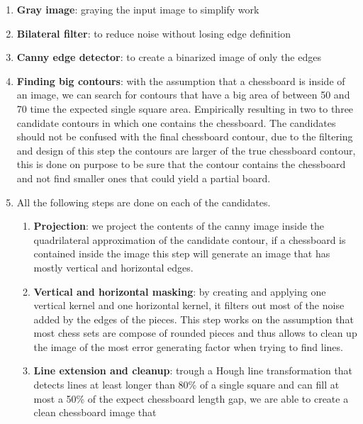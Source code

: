 \begin{enumerate}
    \item 
    {
        \textbf{Gray image}: graying the input image to simplify work
    }
    \item 
    {
        \textbf{Bilateral filter}: to reduce noise without losing edge definition
    }
    \item
    {
        \textbf{Canny edge detector}: to create a binarized image of only the edges
    }
    \item 
    {
        \textbf{Finding big contours}: with the assumption that a chessboard is inside of an image, we can search for contours 
        that have a big area of between 50 and 70 time the expected single square area. Empirically resulting in two to three candidate contours in which 
        one contains the chessboard. \newline
        The candidates should not be confused with the final chessboard contour, due to the filtering and design of this step the contours are larger of the true 
        chessboard contour, this is done on purpose to be sure that the contour contains the chessboard and not find smaller ones that could yield a partial board. 
    }
    \item 
    {
        All the following steps are done on each of the candidates.
        \begin{enumerate}
            \item 
            {
                \textbf{Projection}: we project the contents of the canny image inside the quadrilateral approximation of the candidate contour, 
                if a chessboard is contained inside the image this step will generate an image that has mostly vertical and horizontal edges.
            }
            \item
            {
                \textbf{Vertical and horizontal masking}: by creating and applying one vertical kernel and one horizontal kernel, it filters out most
                of the noise added by the edges of the pieces. \newline
                This step works on the assumption that most chess sets are compose of rounded pieces and thus allows to clean up the image of the most 
                error generating factor when trying to find lines.
            }
            \item
            {
                \textbf{Line extension and cleanup}: trough a Hough line transformation that detects lines at least longer than 80\% of a 
                single square and can fill at most a 50\% of the expect chessboard length gap, we are able to create a clean chessboard image that 
}
\end{enumerate}}
\end{enumerate}
